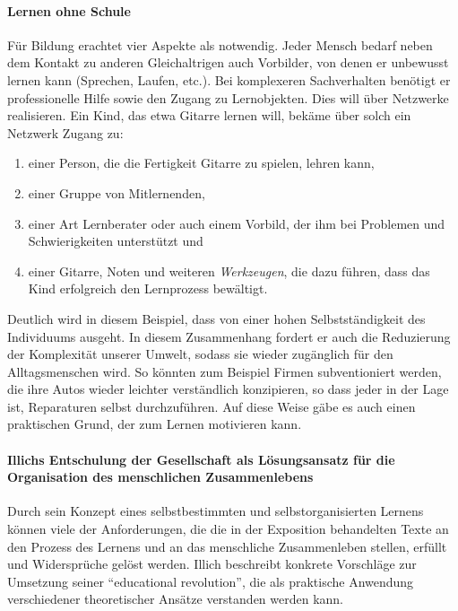 \paragraph{Lernen ohne Schule}

Für Bildung erachtet \citeauthor{Illich-1971} vier Aspekte als notwendig.
Jeder Mensch bedarf neben dem Kontakt zu anderen Gleichaltrigen auch Vorbilder, von denen er unbewusst lernen kann (Sprechen, Laufen, etc.).
Bei komplexeren Sachverhalten benötigt er professionelle Hilfe sowie den Zugang zu Lernobjekten.
Dies will \citeauthor{Illich-1971} über Netzwerke realisieren.
Ein Kind, das etwa Gitarre lernen will, bekäme über solch ein Netzwerk Zugang zu:

\begin{enumerate}
		\item einer Person, die die Fertigkeit Gitarre zu spielen, lehren kann,
		\item einer Gruppe von Mitlernenden,
		\item einer Art Lernberater oder auch einem Vorbild, der ihm bei Problemen und Schwierigkeiten unterstützt und
		\item einer Gitarre, Noten und weiteren \emph{Werkzeugen}, die dazu führen, dass das Kind erfolgreich den Lernprozess bewältigt.
\end{enumerate}

Deutlich wird in diesem Beispiel, dass \citeauthor{Illich-1971} von einer hohen Selbstständigkeit des Individuums ausgeht.
In diesem Zusammenhang fordert er auch die Reduzierung der Komplexität unserer Umwelt, sodass sie wieder zugänglich für den Alltagsmenschen wird.
So könnten zum Beispiel Firmen subventioniert werden, die ihre Autos wieder leichter verständlich konzipieren, so dass jeder in der Lage ist, Reparaturen selbst durchzuführen.
Auf diese Weise gäbe es auch einen praktischen Grund, der zum Lernen motivieren kann.


\paragraph{Illichs Entschulung der Gesellschaft als Lösungsansatz für die Organisation des menschlichen Zusammenlebens}

Durch sein Konzept eines selbstbestimmten und selbstorganisierten Lernens können viele der Anforderungen, die die in der Exposition behandelten Texte an den Prozess des Lernens und an das menschliche Zusammenleben stellen, erfüllt und Widersprüche gelöst werden.
Illich beschreibt konkrete Vorschläge zur Umsetzung seiner ``educational revolution'', die als praktische Anwendung verschiedener theoretischer Ansätze verstanden werden kann.

